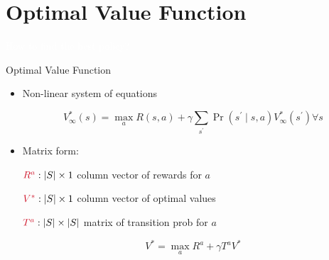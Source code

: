 \documentclass[11pt,table]{beamer}
\begin{document}
\section{Optimal Value Function}
{
\begin{frame}
\centering
\Huge
\textcolor{white}{How to find the best policy?}
\thispagestyle{empty}
\end{frame}
}

\begin{frame}{Optimal Value Function}

\begin{itemize}
		\item Non-linear system of equations

$$
V_{\infty}^{*}(s)=\max _{a} R(s, a)+\gamma \sum_{s^{\prime}} \operatorname{Pr}\left(s^{\prime} \mid s, a\right) V_{\infty}^{*}\left(s^{\prime}\right) \forall s
$$

\item Matrix form:

$\textcolor{red1}{R^{a}}:|S| \times 1$ column vector of rewards for $a$

$\textcolor{red1}{V^{*}}:|S| \times 1$ column vector of optimal values

$\textcolor{red1}{T^{a}}:|S| \times|S|$ matrix of transition prob for $a$

$$
V^{*}=\max _{a} R^{a}+\gamma T^{a} V^{*}
$$ 
\end{itemize}
    
\end{frame}
\end{document}
